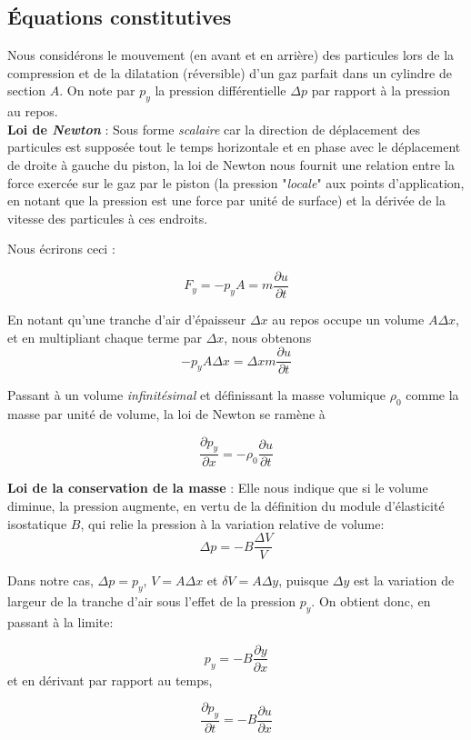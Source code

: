 \subsection{Équations constitutives} 

Nous considérons le mouvement (en avant et en arrière) des particules  lors de la compression et de la dilatation (réversible) d'un gaz parfait dans un cylindre de section $A$. On note par $p_{y}$ la pression différentielle $\Delta p$ par rapport à la pression au repos.\\

\textbf{Loi de \textit{Newton}} : Sous forme \textit{scalaire} car la direction de déplacement des particules est supposée tout le temps horizontale et en phase avec le déplacement
de droite à gauche du piston, la loi de Newton nous fournit une relation entre la force exercée sur le gaz par le piston (la pression "\textit{locale}" aux points d'application, en notant que la pression est une force par unité de surface) et la dérivée de la vitesse des particules à ces endroits.

Nous écrirons ceci : 

$$F_{y} = -p_{y} A = m \frac{\partial{u}}{\partial t}$$ 

En notant qu'une tranche d'air d'épaisseur $\Delta x$  au repos occupe un volume $A\Delta x$, et en multipliant chaque terme par $\Delta x$, nous obtenons 
$$-p_{y} A\Delta x = \Delta x m \frac{\partial{u}}{\partial t}$$ 

Passant à  un volume \textit{infinitésimal} et définissant la masse volumique 
$\rho_{0}$ comme la masse par unité de volume, la loi de Newton se ramène à

\[\frac{\partial p_{y}}{\partial x} = - \rho_{0} \frac{\partial{u}}{\partial t}\]


\textbf{Loi de la conservation de la masse}  : Elle nous indique que si le volume diminue, la pression augmente, en vertu de la définition du module d'élasticité isostatique $B$, qui relie la pression à la variation relative de volume:
\[\Delta p  = - B \frac{\Delta V}{V} \]

Dans notre cas, $\Delta p = p_y$, $V = A \Delta x$ et $\delta V = A \Delta y$, puisque $\Delta y$ est la variation de largeur de la tranche d'air sous l'effet de la pression $p_y$. On obtient donc, en passant à la limite:

\[p_{y}  = - B \frac{\partial y}{\partial x}\] et en dérivant par rapport au temps,

\[\frac{\partial p_{y}}{\partial t} =  - B \frac{\partial u}{\partial x}\]


